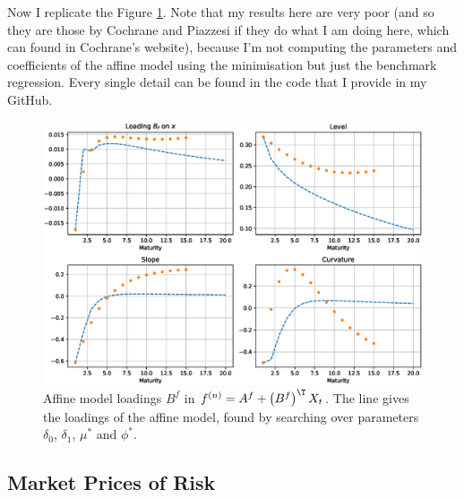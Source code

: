 Now I replicate the Figure \ref{fig:5}. Note that my results here are very poor (and so they are those by Cochrane and Piazzesi if they do what I am doing here, which can found in Cochrane's website), because I'm not computing the parameters and coefficients of the affine model using the minimisation but just the benchmark regression. Every single detail can be found in the code that I provide in my GitHub.
\begin{figure}[h!]
	\centering
	\caption{Affine model loadings $B^f$ in $f^{(n)} = A^f + \left(B^f\right)^\T X_t$. The line gives the loadings of the affine model, found by searching over parameters $\delta_0$, $\delta_1$, $\mu^\ast$ and $\phi^\ast$. }\label{fig:5}
	\includegraphics[scale=0.5]{fig/eps/Figure5.eps}
\end{figure}

\subsection{Market Prices of Risk}

